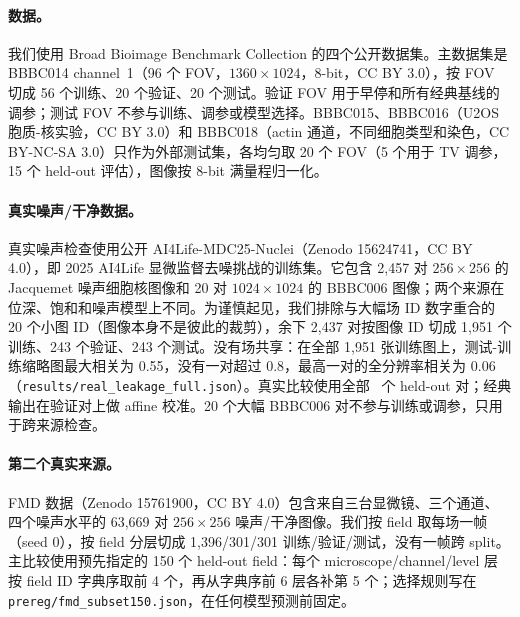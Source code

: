 \documentclass[11pt]{ctexart}
\begin{document}
\paragraph{数据。}
我们使用 Broad Bioimage Benchmark Collection 的四个公开数据集\cite{ljosa2012bbbc}。主数据集是 BBBC014 channel~1（96 个 FOV，$1360\times1024$，8-bit，CC BY 3.0），按 FOV 切成 56 个训练、20 个验证、20 个测试。验证 FOV 用于早停和所有经典基线的调参；测试 FOV 不参与训练、调参或模型选择。BBBC015、BBBC016（U2OS 胞质-核实验，CC BY 3.0）和 BBBC018（actin 通道，不同细胞类型和染色，CC BY-NC-SA 3.0）只作为外部测试集，各均匀取 20 个 FOV（5 个用于 TV 调参，15 个 held-out 评估），图像按 8-bit 满量程归一化。

\paragraph{真实噪声/干净数据。}
真实噪声检查使用公开 AI4Life-MDC25-Nuclei\cite{ai4life_mdc25_2025}（Zenodo 15624741，CC BY 4.0），即 2025 AI4Life 显微监督去噪挑战的训练集。它包含 2{,}457 对 $256\times256$ 的 Jacquemet 噪声细胞核图像和 20 对 $1024\times1024$ 的 BBBC006 图像；两个来源在位深、饱和和噪声模型上不同。为谨慎起见，我们排除与大幅场 ID 数字重合的 20 个小图 ID（图像本身不是彼此的裁剪），余下 2{,}437 对按图像 ID 切成 1{,}951 个训练、243 个验证、243 个测试。没有场共享：在全部 1{,}951 张训练图上，测试-训练缩略图最大相关为 0.55，没有一对超过 0.8，最高一对的全分辨率相关为 0.06（\texttt{results/real\_leakage\_full.json}）。真实比较使用全部 \RealN\ 个 held-out 对；经典输出在验证对上做 affine 校准。20 个大幅 BBBC006 对不参与训练或调参，只用于跨来源检查。

\paragraph{第二个真实来源。}
FMD 数据\cite{zhang2019fmd,ai4life_mdc25_fmd_2025}（Zenodo 15761900，CC BY 4.0）包含来自三台显微镜、三个通道、四个噪声水平的 63{,}669 对 $256\times256$ 噪声/干净图像。我们按 field 取每场一帧（seed 0），按 field 分层切成 1{,}396/301/301 训练/验证/测试，没有一帧跨 split。主比较使用预先指定的 150 个 held-out field：每个 microscope/channel/level 层按 field ID 字典序取前 4 个，再从字典序前 6 层各补第 5 个；选择规则写在 \texttt{prereg/fmd\_subset150.json}，在任何模型预测前固定。
\end{document}
